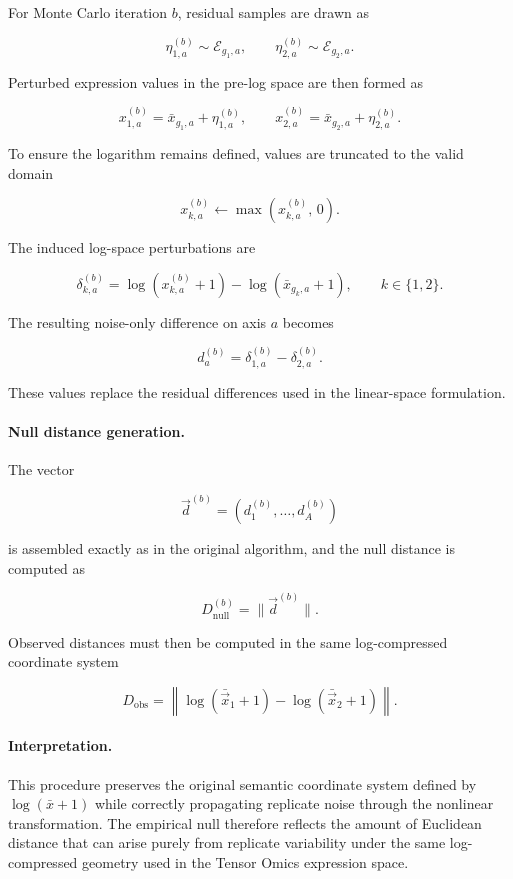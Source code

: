 For Monte Carlo iteration $b$, residual samples are drawn as

\[
\eta_{1,a}^{(b)} \sim \mathcal{E}_{g_1,a},
\qquad
\eta_{2,a}^{(b)} \sim \mathcal{E}_{g_2,a}.
\]

Perturbed expression values in the pre-log space are then formed as

\[
x_{1,a}^{(b)} = \bar{x}_{g_1,a} + \eta_{1,a}^{(b)},
\qquad
x_{2,a}^{(b)} = \bar{x}_{g_2,a} + \eta_{2,a}^{(b)}.
\]

To ensure the logarithm remains defined, values are truncated to the valid domain

\[
x_{k,a}^{(b)} \leftarrow \max(x_{k,a}^{(b)},\,0).
\]

The induced log-space perturbations are

\[
\delta_{k,a}^{(b)}
=
\log(x_{k,a}^{(b)} + 1) - \log(\bar{x}_{g_k,a} + 1),
\qquad k \in \{1,2\}.
\]

The resulting noise-only difference on axis $a$ becomes

\[
d_a^{(b)} =
\delta_{1,a}^{(b)} - \delta_{2,a}^{(b)}.
\]

These values replace the residual differences used in the linear-space formulation.

\paragraph{Null distance generation.}

The vector

\[
\vec{d}^{(b)} = (d_1^{(b)}, \ldots, d_A^{(b)})
\]

is assembled exactly as in the original algorithm, and the null distance is computed as

\[
D_{\mathrm{null}}^{(b)} = \|\vec{d}^{(b)}\|.
\]

Observed distances must then be computed in the same log-compressed coordinate system

\[
D_{\mathrm{obs}} =
\left\|
\log(\bar{\vec{x}}_1 + 1) -
\log(\bar{\vec{x}}_2 + 1)
\right\|.
\]

\paragraph{Interpretation.}

This procedure preserves the original semantic coordinate system defined by $\log(\bar{x}+1)$ while correctly propagating replicate noise through the nonlinear transformation. The empirical null therefore reflects the amount of Euclidean distance that can arise purely from replicate variability under the same log-compressed geometry used in the Tensor Omics expression space.

